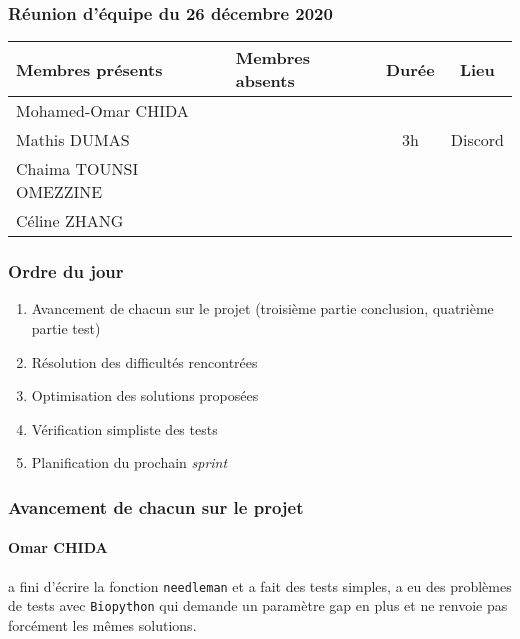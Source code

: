 


% 
\subsubsection*{\large{Réunion d'équipe du 26 décembre 2020}}
\begin{center}
\begin{tabular}{| l | l || c | c |}
    \hline
    Membres présents & Membres absents & Durée & Lieu \\
    \hline
    Mohamed-Omar CHIDA & & & \\ Mathis DUMAS & & 3h & Discord \\ Chaima TOUNSI OMEZZINE & & & \\ Céline ZHANG & & & \\
    \hline
\end{tabular}
\end{center}

\subsubsection*{Ordre du jour}
\begin{enumerate}
    \item Avancement de chacun sur le projet (troisième partie conclusion, quatrième partie test)
    \item Résolution des difficultés rencontrées
    \item Optimisation des solutions proposées
    \item Vérification simpliste des tests
    \item Planification du prochain \textsl{sprint}
\end{enumerate}

\subsubsection*{Avancement de chacun sur le projet}
\paragraph*{Omar CHIDA} a fini d'écrire la fonction \texttt{needleman} et a fait des tests simples, a eu des problèmes de tests avec \texttt{Biopython} qui demande un paramètre \textsf{gap} en plus et ne renvoie pas forcément les mêmes solutions.

